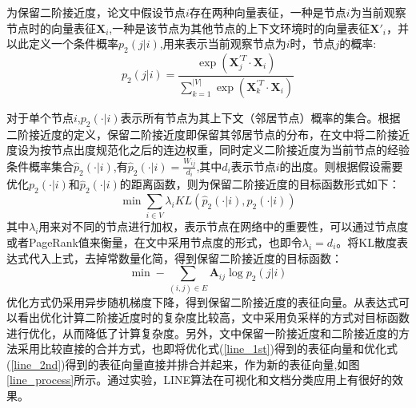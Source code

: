  为保留二阶接近度，论文中假设节点$i$存在两种向量表征，一种是节点$i$为当前观察节点时的向量表征$\textbf{X}_i$,一种是该节点为其他节点的上下文环境时的向量表征$\textbf{X}'_i$，并以此定义一个条件概率$p_2(j|i)$,用来表示当前观察节点为$i$时，节点$j$的概率:
 \begin{equation}
 	p_2(j|i) = \frac{\exp(\textbf{X}_j^{\prime T} \cdot \textbf{X}_i)}{\sum_{k=1}^{|V|}\exp(\textbf{X}_k^{\prime T} \cdot \textbf{X}_i)}
 \end{equation}
 
 对于单个节点$i$,$p_2(\cdot|i)$表示所有节点为其上下文（邻居节点）概率的集合。根据二阶接近度的定义，保留二阶接近度即保留其邻居节点的分布，在文中将二阶接近度设为按节点出度规范化之后的连边权重，同时定义二阶接近度为当前节点的经验条件概率集合$\hat{p}_2(\cdot|i)$,有$\hat{p}_2(\cdot|i) = \frac{W_{ij}}{d_i}$,其中$d_i$表示节点$i$的出度。则根据假设需要优化$p_2(\cdot|i)$和$\hat{p}_2(\cdot|i)$的距离函数，则为保留二阶接近度的目标函数形式如下：
 \begin{equation}
 \min \sum_{i \in V}\lambda_i KL(\hat{p}_2(\cdot|i),p_2(\cdot|i))
 \end{equation}
 其中$\lambda_i$用来对不同的节点进行加权，表示节点在网络中的重要性，可以通过节点度或者PageRank\cite{page1999pagerank}值来衡量，在文中采用节点度的形式，也即令$\lambda_i=d_i$。将KL散度表达式代入上式，去掉常数量化简，得到保留二阶接近度的目标函数：
 \begin{equation}\label{line_2nd}
 \min -\sum_{(i,j) \in E} \textbf{A}_{ij}\log p_2(j|i)
 \end{equation}
 优化方式仍采用异步随机梯度下降，得到保留二阶接近度的表征向量。从表达式可以看出优化计算二阶接近度时的复杂度比较高，文中采用负采样的方式对目标函数进行优化，从而降低了计算复杂度。另外，文中保留一阶接近度和二阶接近度的方法采用比较直接的合并方式，也即将优化式(\ref{line_1st})得到的表征向量和优化式(\ref{line_2nd})得到的表征向量直接并排合并起来，作为新的表征向量,如图\ref{line_process}所示。通过实验，LINE算法在可视化和文档分类应用上有很好的效果。

